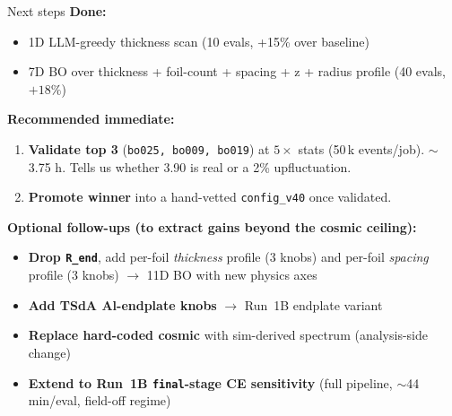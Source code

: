 \documentclass[10pt,aspectratio=169]{beamer}
\begin{document}
\begin{frame}{Next steps}
\textbf{Done:}
\begin{itemize}
\item 1D LLM-greedy thickness scan (10 evals, +15\% over baseline)
\item 7D BO over thickness + foil-count + spacing + z + radius profile (40 evals, $+18\%$)
\end{itemize}

\medskip
\textbf{Recommended immediate:}
\begin{enumerate}
\item \textbf{Validate top 3} (\texttt{bo025, bo009, bo019}) at $5\times$ stats (50\,k events/job).
  $\sim$3.75 h. Tells us whether 3.90 is real or a 2\% upfluctuation.
\item \textbf{Promote winner} into a hand-vetted \texttt{config\_v40} once validated.
\end{enumerate}

\medskip
\textbf{Optional follow-ups (to extract gains beyond the cosmic ceiling):}
\begin{itemize}
\item \textbf{Drop \texttt{R\_end}}, add per-foil \emph{thickness} profile (3 knobs) and
      per-foil \emph{spacing} profile (3 knobs) $\to$ 11D BO with new physics axes
\item \textbf{Add TSdA Al-endplate knobs} $\to$ Run~1B endplate variant
\item \textbf{Replace hard-coded cosmic} with sim-derived spectrum (analysis-side change)
\item \textbf{Extend to Run~1B \texttt{final}-stage CE sensitivity}
      (full pipeline, $\sim$44 min/eval, field-off regime)
\end{itemize}
\end{frame}
\end{document}
